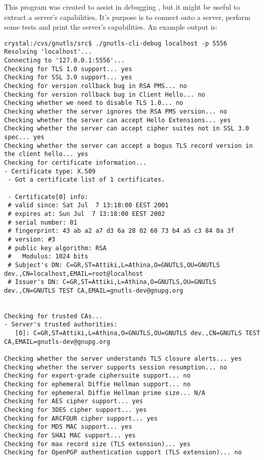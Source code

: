This program was created to assist in debugging \gnutls{}, but it
might be useful to extract a \tls{} server's capabilities. 
It's purpose is to connect onto a \tls{} server, perform
some tests and print the server's capabilities. An example output is:

\begin{verbatim}
crystal:/cvs/gnutls/src$ ./gnutls-cli-debug localhost -p 5556
Resolving 'localhost'...
Connecting to '127.0.0.1:5556'...
Checking for TLS 1.0 support... yes
Checking for SSL 3.0 support... yes
Checking for version rollback bug in RSA PMS... no
Checking for version rollback bug in Client Hello... no
Checking whether we need to disable TLS 1.0... no
Checking whether the server ignores the RSA PMS version... no
Checking whether the server can accept Hello Extensions... yes
Checking whether the server can accept cipher suites not in SSL 3.0 spec... yes
Checking whether the server can accept a bogus TLS record version in the client hello... yes
Checking for certificate information...
- Certificate type: X.509
 - Got a certificate list of 1 certificates.

 - Certificate[0] info:
 # valid since: Sat Jul  7 13:18:00 EEST 2001
 # expires at: Sun Jul  7 13:18:00 EEST 2002
 # serial number: 01 
 # fingerprint: 43 ab a2 a7 d3 6a 28 02 60 73 b4 a5 c3 84 0a 3f 
 # version: #3
 # public key algorithm: RSA
 #   Modulus: 1024 bits
 # Subject's DN: C=GR,ST=Attiki,L=Athina,O=GNUTLS,OU=GNUTLS dev.,CN=localhost,EMAIL=root@localhost
 # Issuer's DN: C=GR,ST=Attiki,L=Athina,O=GNUTLS,OU=GNUTLS dev.,CN=GNUTLS TEST CA,EMAIL=gnutls-dev@gnupg.org

 
Checking for trusted CAs...
- Server's trusted authorities:
   [0]: C=GR,ST=Attiki,L=Athina,O=GNUTLS,OU=GNUTLS dev.,CN=GNUTLS TEST CA,EMAIL=gnutls-dev@gnupg.org
 
Checking whether the server understands TLS closure alerts... yes
Checking whether the server supports session resumption... no
Checking for export-grade ciphersuite support... no
Checking for ephemeral Diffie Hellman support... no
Checking for ephemeral Diffie Hellman prime size... N/A
Checking for AES cipher support... yes
Checking for 3DES cipher support... yes
Checking for ARCFOUR cipher support... yes
Checking for MD5 MAC support... yes
Checking for SHA1 MAC support... yes
Checking for max record size (TLS extension)... yes
Checking for OpenPGP authentication support (TLS extension)... no

\end{verbatim}

